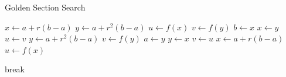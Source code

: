 \documentclass[letterpaper]{article}
\begin{document}
\begin{algorithm}[H]
    \caption{Golden Section Search}
    \begin{algorithmic}[1]
            \State $x \gets a + r(b - a)$
            \State $y \gets a + r^2 (b - a)$
            \State $u \gets f(x)$
            \State $v \gets f(y)$
                    \State $b \gets x$
                    \State $x \gets y$
                    \State $u \gets v$
                    \State $y \gets a + r^2 (b - a)$
                    \State $v \gets f(y)$
                \Else 
                    \State $a \gets y$
                    \State $y \gets x$
                    \State $v \gets u$
                    \State $x \gets a + r (b - a)$
                    \State $u \gets f(x)$
                \EndIf 

                    \State break
                \EndIf 
            \EndFor 
        \EndFunction
    \end{algorithmic}
\end{algorithm}
\end{document}
